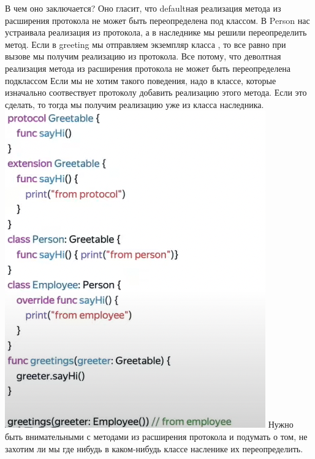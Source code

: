 \documentclass{article}
\begin{document}
    \newline
    В чем оно заключается? Оно гласит, что defaultная реализация метода из расширения протокола не может быть переопределена под классом. 
    \newline
    В Person нас устраивала реализация из протокола, а в наследнике мы решили переопределить метод. 
    \newline
    Если в greeting мы отправляем экземпляр класса , то все равно при вызове  мы получим реализацию из протокола. 
    \newline
    Все потому, что деволтная реализация метода из расширения протокола не может быть переопределена подклассом
    \newline
    Если мы не хотим такого поведения, надо в классе, которые изначально соотвествует протоколу добавить реализацию этого метода. Если это сделать, то тогда мы получим реализацию уже из класса наследника. 
    \newline
    \includegraphics[scale = 0.5]{pic/Снимок экрана 2023-07-28 в 20.00.43.png}
    \newline
    Нужно быть внимательными с методами из расширения протокола и подумать о том, не захотим ли мы где нибудь в каком-нибудь классе насленике их переопределить. 
\end{document}
